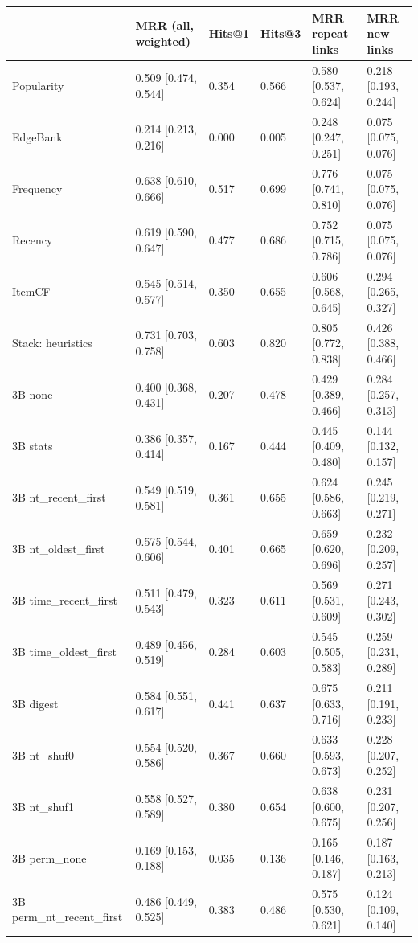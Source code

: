 \begin{tabular}{llllll}
\toprule
 & MRR (all, weighted) & Hits@1 & Hits@3 & MRR repeat links & MRR new links \\
\midrule
Popularity & 0.509 [0.474, 0.544] & 0.354 & 0.566 & 0.580 [0.537, 0.624] & 0.218 [0.193, 0.244] \\
EdgeBank & 0.214 [0.213, 0.216] & 0.000 & 0.005 & 0.248 [0.247, 0.251] & 0.075 [0.075, 0.076] \\
Frequency & 0.638 [0.610, 0.666] & 0.517 & 0.699 & 0.776 [0.741, 0.810] & 0.075 [0.075, 0.076] \\
Recency & 0.619 [0.590, 0.647] & 0.477 & 0.686 & 0.752 [0.715, 0.786] & 0.075 [0.075, 0.076] \\
ItemCF & 0.545 [0.514, 0.577] & 0.350 & 0.655 & 0.606 [0.568, 0.645] & 0.294 [0.265, 0.327] \\
Stack: heuristics & 0.731 [0.703, 0.758] & 0.603 & 0.820 & 0.805 [0.772, 0.838] & 0.426 [0.388, 0.466] \\
3B none & 0.400 [0.368, 0.431] & 0.207 & 0.478 & 0.429 [0.389, 0.466] & 0.284 [0.257, 0.313] \\
3B stats & 0.386 [0.357, 0.414] & 0.167 & 0.444 & 0.445 [0.409, 0.480] & 0.144 [0.132, 0.157] \\
3B nt\_recent\_first & 0.549 [0.519, 0.581] & 0.361 & 0.655 & 0.624 [0.586, 0.663] & 0.245 [0.219, 0.271] \\
3B nt\_oldest\_first & 0.575 [0.544, 0.606] & 0.401 & 0.665 & 0.659 [0.620, 0.696] & 0.232 [0.209, 0.257] \\
3B time\_recent\_first & 0.511 [0.479, 0.543] & 0.323 & 0.611 & 0.569 [0.531, 0.609] & 0.271 [0.243, 0.302] \\
3B time\_oldest\_first & 0.489 [0.456, 0.519] & 0.284 & 0.603 & 0.545 [0.505, 0.583] & 0.259 [0.231, 0.289] \\
3B digest & 0.584 [0.551, 0.617] & 0.441 & 0.637 & 0.675 [0.633, 0.716] & 0.211 [0.191, 0.233] \\
3B nt\_shuf0 & 0.554 [0.520, 0.586] & 0.367 & 0.660 & 0.633 [0.593, 0.673] & 0.228 [0.207, 0.252] \\
3B nt\_shuf1 & 0.558 [0.527, 0.589] & 0.380 & 0.654 & 0.638 [0.600, 0.675] & 0.231 [0.207, 0.256] \\
3B perm\_none & 0.169 [0.153, 0.188] & 0.035 & 0.136 & 0.165 [0.146, 0.187] & 0.187 [0.163, 0.213] \\
3B perm\_nt\_recent\_first & 0.486 [0.449, 0.525] & 0.383 & 0.486 & 0.575 [0.530, 0.621] & 0.124 [0.109, 0.140] \\

\end{tabular}
